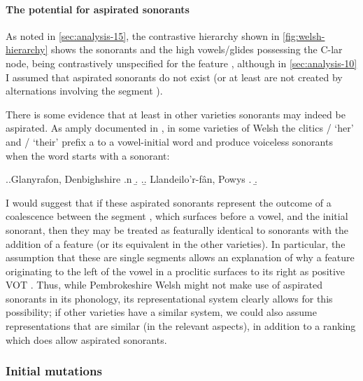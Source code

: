 \paragraph{The potential for aspirated sonorants}
\label{sec:potent-aspir-sonor}

As noted in \cref{sec:analysis-15}, the contrastive hierarchy shown in \cref{fig:welsh-hierarchy} shows the sonorants \ipa{[m~n~ŋ~l~r]} and the high vowels\fshyp glides \ipa{[i~u]} possessing the C-lar node, \ie being contrastively unspecified for the feature , although in \cref{sec:analysis-10} I assumed that aspirated sonorants do not exist (or at least are not created by alternations involving the segment \ipa{[h]}).

There is some evidence that at least in other varieties sonorants may indeed be aspirated. As amply documented in \citet{thomas00:_welsh}, in some varieties of Welsh the clitics \ipa{[i]}/\ipa{[ei]} `her' and \ipa{[i]}/\ipa{[ei]} `their' prefix a \ipa{[h]} to a vowel-initial word and produce voiceless sonorants \ipa{[m̥\kern1pt~n̥~l̥~r̥~w̥~j̥]} when the word starts with a sonorant:

\ex.\a.Glanyrafon, Denbighshire
\a.n
\b.
\z.\b. Llandeilo'r-fân, Powys
\a.
\b.

I would suggest that if these aspirated sonorants represent the outcome of a coalescence between the segment \ipa{[h]}, which surfaces before a vowel, and the initial sonorant, then they may be treated as featurally identical to sonorants with the addition of a  feature (or its equivalent in the other varieties). In particular, the assumption that these are single segments allows an explanation of why a  feature originating to the left of the vowel in a proclitic surfaces to its right as positive VOT \citep[\cfm][for the phonetics of Welsh aspirated sonorants]{ball-phon,ball01:_welsh_phonet}. Thus, while Pembrokeshire Welsh might not make use of aspirated sonorants in its phonology, its representational system clearly allows for this possibility; if other varieties have a similar system, we could also assume representations that are similar (in the relevant aspects), in addition to a ranking which does allow aspirated sonorants.

\subsubsection{Initial mutations}
\label{sec:initial-mutations}

